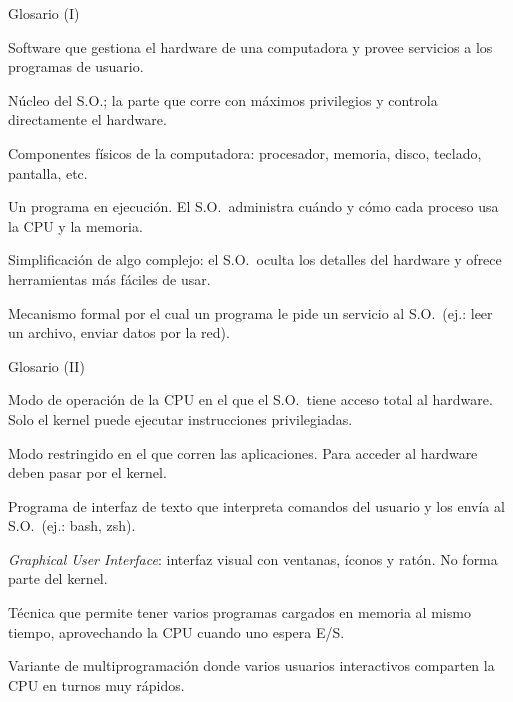 \documentclass[xcolor=svgnames]{beamer}
\begin{document}
\begin{frame}{Glosario (I)}
  \begin{description}[labelwidth=3.2cm, leftmargin=!, font=\color{mqred}\bfseries]
    \item[Sistema Operativo] Software que gestiona el hardware de una computadora
      y provee servicios a los programas de usuario.
    \item[Kernel] Núcleo del S.O.; la parte que corre con máximos privilegios
      y controla directamente el hardware.
    \item[Hardware] Componentes físicos de la computadora: procesador, memoria,
      disco, teclado, pantalla, etc.
    \item[Proceso] Un programa en ejecución. El S.O.\ administra cuándo y cómo
      cada proceso usa la CPU y la memoria.
    \item[Abstracción] Simplificación de algo complejo: el S.O.\ oculta los
      detalles del hardware y ofrece herramientas más fáciles de usar.
    \item[Llamada al sistema] Mecanismo formal por el cual un programa le pide
      un servicio al S.O.\ (ej.: leer un archivo, enviar datos por la red).
  \end{description}
\end{frame}

\begin{frame}{Glosario (II)}
  \begin{description}[labelwidth=3.2cm, leftmargin=!, font=\color{mqred}\bfseries]
    \item[Modo kernel] Modo de operación de la CPU en el que el S.O.\ tiene
      acceso total al hardware. Solo el kernel puede ejecutar instrucciones
      privilegiadas.
    \item[Modo usuario] Modo restringido en el que corren las aplicaciones.
      Para acceder al hardware deben pasar por el kernel.
    \item[Shell] Programa de interfaz de texto que interpreta comandos del
      usuario y los envía al S.O.\ (ej.: bash, zsh).
    \item[GUI] \textit{Graphical User Interface}: interfaz visual con ventanas,
      íconos y ratón. No forma parte del kernel.
    \item[Multiprogramación] Técnica que permite tener varios programas cargados
      en memoria al mismo tiempo, aprovechando la CPU cuando uno espera E/S.
    \item[Timesharing] Variante de multiprogramación donde varios usuarios
      interactivos comparten la CPU en turnos muy rápidos.
  \end{description}
\end{frame}
\end{document}
